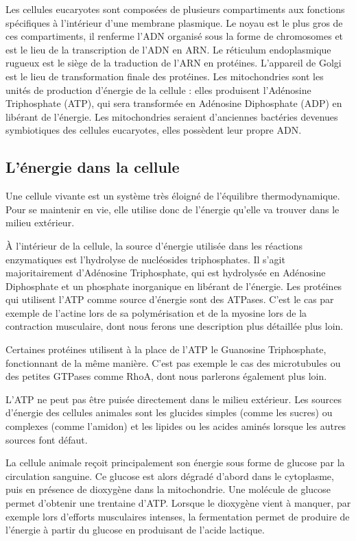 Les cellules eucaryotes sont composées de plusieurs compartiments aux fonctions spécifiques à l'intérieur d'une membrane plasmique. Le noyau est le plus gros de ces compartiments, il renferme l'ADN organisé sous la forme de chromosomes et est le lieu de la transcription de l'ADN en ARN. 
Le réticulum endoplasmique rugueux est le siège de la traduction de l'ARN en protéines. 
L'appareil de Golgi est le lieu de transformation finale des protéines. 
Les mitochondries sont les unités de production d'énergie de la cellule : elles produisent l'Adénosine Triphosphate (ATP), qui sera transformée en Adénosine Diphosphate (ADP) en libérant de l'énergie. Les mitochondries seraient d'anciennes bactéries devenues symbiotiques des cellules eucaryotes, elles possèdent leur propre ADN. 

\subsection{L'énergie dans la cellule}

Une cellule vivante est un système très éloigné de l'équilibre thermodynamique. Pour se maintenir en vie, elle utilise donc de l'énergie qu'elle va trouver dans le milieu extérieur. 

À l'intérieur de la cellule, la source d'énergie utilisée dans les réactions enzymatiques est l'hydrolyse de nucléosides triphosphates. 
Il s'agit majoritairement d'Adénosine Triphosphate, qui est hydrolysée en Adénosine Diphosphate et un phosphate inorganique en libérant de l'énergie. 
Les protéines qui utilisent l'ATP comme source d'énergie sont des ATPases. 
C'est le cas par exemple de l'actine lors de sa polymérisation et de la myosine  lors de la contraction musculaire, dont nous ferons une description plus détaillée plus loin. 

Certaines protéines utilisent à la place de l'ATP le Guanosine Triphosphate, fonctionnant de la même manière. 
C'est pas exemple le cas des microtubules ou des petites GTPases comme RhoA, dont nous parlerons également plus loin. 

L'ATP ne peut pas être puisée directement dans le milieu extérieur. Les sources d'énergie des cellules animales sont les glucides simples (comme les sucres) ou complexes (comme l'amidon) et les lipides ou les acides aminés lorsque les autres sources font défaut. 

La cellule animale reçoit principalement son énergie sous forme de glucose par la circulation sanguine. Ce glucose est alors dégradé d'abord dans le cytoplasme, puis en présence de dioxygène dans la mitochondrie. 
Une molécule de glucose permet d'obtenir une trentaine d'ATP. 
Lorsque le dioxygène vient à manquer, par exemple lors d'efforts musculaires intenses, la fermentation permet de produire de l'énergie à partir du glucose en produisant de l'acide lactique. 

